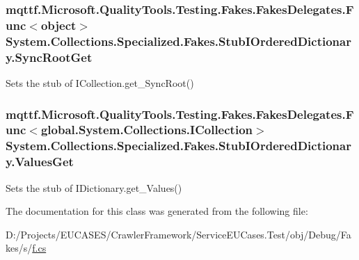 \hypertarget{class_system_1_1_collections_1_1_specialized_1_1_fakes_1_1_stub_i_ordered_dictionary_ae6b8b8c57ff1f90a736d96701306a215}{
\subsubsection[{Sync\-Root\-Get}]{\setlength{\rightskip}{0pt plus 5cm}mqttf.\-Microsoft.\-Quality\-Tools.\-Testing.\-Fakes.\-Fakes\-Delegates.\-Func$<$object$>$ System.\-Collections.\-Specialized.\-Fakes.\-Stub\-I\-Ordered\-Dictionary.\-Sync\-Root\-Get}}\label{class_system_1_1_collections_1_1_specialized_1_1_fakes_1_1_stub_i_ordered_dictionary_ae6b8b8c57ff1f90a736d96701306a215}


Sets the stub of I\-Collection.\-get\-\_\-\-Sync\-Root()

\hypertarget{class_system_1_1_collections_1_1_specialized_1_1_fakes_1_1_stub_i_ordered_dictionary_a23e0d2825e0d1cd60595b71866706e9b}{
\subsubsection[{Values\-Get}]{\setlength{\rightskip}{0pt plus 5cm}mqttf.\-Microsoft.\-Quality\-Tools.\-Testing.\-Fakes.\-Fakes\-Delegates.\-Func$<$global.\-System.\-Collections.\-I\-Collection$>$ System.\-Collections.\-Specialized.\-Fakes.\-Stub\-I\-Ordered\-Dictionary.\-Values\-Get}}\label{class_system_1_1_collections_1_1_specialized_1_1_fakes_1_1_stub_i_ordered_dictionary_a23e0d2825e0d1cd60595b71866706e9b}


Sets the stub of I\-Dictionary.\-get\-\_\-\-Values()



The documentation for this class was generated from the following file\-:\begin{DoxyCompactItemize}
\item 
D\-:/\-Projects/\-E\-U\-C\-A\-S\-E\-S/\-Crawler\-Framework/\-Service\-E\-U\-Cases.\-Test/obj/\-Debug/\-Fakes/s/\hyperlink{s_2f_8cs}{f.\-cs}\end{DoxyCompactItemize}
